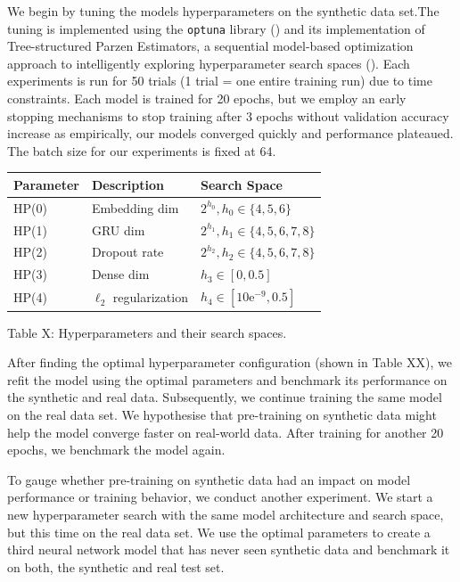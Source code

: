 \documentclass[11pt]{article}
\begin{document}
We begin by tuning the models hyperparameters on the synthetic data set.The tuning is implemented using the \texttt{optuna} library (\cite{optunapaper}) and its implementation of Tree-structured Parzen Estimators, a sequential model-based optimization approach to intelligently exploring hyperparameter search spaces (\cite{bergstraTPE}). Each experiments is run for 50 trials (1 trial = one entire training run) due to time constraints. Each model is trained for 20 epochs, but we employ an early stopping mechanisms to stop training after 3 epochs without validation accuracy increase as empirically, our models converged quickly and performance plateaued. The batch size for our experiments is fixed at 64.

\begin{center}
\begin{tabular}{lll}
\toprule
    Parameter & Description & Search Space \\
\midrule
    HP(0) & Embedding dim & $2^{h_0}, h_0 \in \{4, 5, 6\}$\\
    HP(1) & GRU dim & $2^{h_1}, h_1 \in \{4, 5, 6, 7, 8\}$\\
    HP(2) & Dropout rate & $2^{h_2}, h_2 \in \{4, 5, 6, 7, 8\}$\\
    HP(3) & Dense dim & $h_3 \in [0, 0.5]$ \\
    HP(4) & $\ell_2$ regularization & $h_4 \in [10\mathrm{e}^{-9}, 0.5]$ \\
\bottomrule
\end{tabular}
\end{center}
\begin{center}
	Table X: Hyperparameters and their search spaces.
\end{center}

After finding the optimal hyperparameter configuration (shown in Table XX), we refit the model using the optimal parameters and benchmark its performance on the synthetic and real data. Subsequently, we continue training the same model on the real data set. We hypothesise that pre-training on synthetic data might help the model converge faster on real-world data. After training for another 20 epochs, we benchmark the model again.

To gauge whether pre-training on synthetic data had an impact on model performance or training behavior, we conduct another experiment. We start a new hyperparameter search with the same model architecture and search space, but this time on the real data set. We use the optimal parameters to create a third neural network model that has never seen synthetic data and benchmark it on both, the synthetic and real test set.
\end{document}
